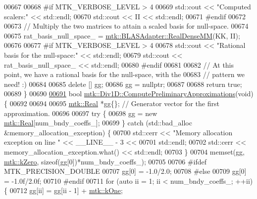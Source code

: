 \begin{DoxyCode}
{{00667 
00668 \textcolor{preprocessor}{  #if MTK\_VERBOSE\_LEVEL > 4}
00669   std::cout << \textcolor{stringliteral}{"Computed scalers:"} << std::endl;
00670   std::cout << II << std::endl;
00671 \textcolor{preprocessor}{  #endif}
00672 
00673   \textcolor{comment}{// Multiply the two matrices to attain a scaled basis for null-space.}
00674 
00675   rat\_basis\_null\_space\_ = \hyperlink{classmtk_1_1BLASAdapter_acebd0e9bfe0bdd609c7fbea98ccfd3b5}{mtk::BLASAdapter::RealDenseMM}(KK, II);
00676 
00677 \textcolor{preprocessor}{  #if MTK\_VERBOSE\_LEVEL > 4}
00678   std::cout << \textcolor{stringliteral}{"Rational basis for the null-space:"} << std::endl;
00679   std::cout << rat\_basis\_null\_space\_ << std::endl;
00680 \textcolor{preprocessor}{  #endif}
00681 
00682   \textcolor{comment}{// At this point, we have a rational basis for the null-space, with the}
00683   \textcolor{comment}{// pattern we need! :)}
00684 
00685   \textcolor{keyword}{delete} [] gg;
00686   gg = \textcolor{keyword}{nullptr};
00687 
00688   \textcolor{keywordflow}{return} \textcolor{keyword}{true};
00689 \}
00690 
\hypertarget{mtk__div__1d_8cc_source_l00691}{}\hyperlink{classmtk_1_1Div1D_a4be0534a4e22d44a7aedde326cc3f3b6}{00691} \textcolor{keywordtype}{bool} \hyperlink{classmtk_1_1Div1D_a4be0534a4e22d44a7aedde326cc3f3b6}{mtk::Div1D::ComputePreliminaryApproximations}(\textcolor{keywordtype}{void}) \{
00692 
00694 
00695   \hyperlink{group__c01-roots_gac080bbbf5cbb5502c9f00405f894857d}{mtk::Real} *gg\{\}; \textcolor{comment}{// Generator vector for the first approximation.}
00696 
00697   \textcolor{keywordflow}{try} \{
00698     gg = \textcolor{keyword}{new} \hyperlink{group__c01-roots_gac080bbbf5cbb5502c9f00405f894857d}{mtk::Real}[num\_bndy\_coeffs\_];
00699   \} \textcolor{keywordflow}{catch} (std::bad\_alloc &memory\_allocation\_exception) \{
00700     std::cerr << \textcolor{stringliteral}{"Memory allocation exception on line "} << \_\_LINE\_\_ - 3 <<
00701 std::endl;
00702     std::cerr << memory\_allocation\_exception.what() << std::endl;
00703   \}
00704   memset(gg, \hyperlink{group__c01-roots_ga59a451a5fae30d59649bcda274fea271}{mtk::kZero}, \textcolor{keyword}{sizeof}(gg[0])*num\_bndy\_coeffs\_);
00705 
00706 \textcolor{preprocessor}{  #ifdef MTK\_PRECISION\_DOUBLE}
00707   gg[0] = -1.0/2.0;
00708 \textcolor{preprocessor}{  #else}
00709   gg[0] = -1.0f/2.0f;
00710 \textcolor{preprocessor}{  #endif}
00711   \textcolor{keywordflow}{for} (\textcolor{keyword}{auto} ii = 1; ii < num\_bndy\_coeffs\_; ++ii) \{
00712     gg[ii] = gg[ii - 1] + \hyperlink{group__c01-roots_ga26407c24d43b6b95480943340d285c71}{mtk::kOne};
}}
\end{DoxyCode}

